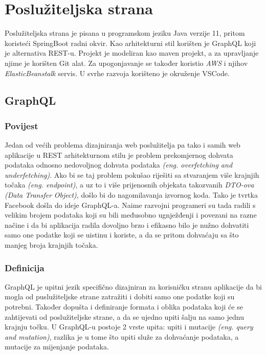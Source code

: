 \documentclass[times, utf8, zavrsni]{fer}
\begin{document}
\begin{multicols}{2}
      
      \label{lst:SQL kod}
\end{multicols}

\chapter{Poslužiteljska strana}
Poslužiteljska strana je pisana u programskom jeziku Java verzije 11, pritom koristeći
SpringBoot radni okvir. Kao arhitekturni stil korišten je GraphQL koji je alternativa REST-u.
Projekt je modeliran kao maven projekt, a za upravljanje njime je korišten Git alat. Za upogonjavanje
se također koristio \textit{AWS} i njihov \textit{ElasticBeanstalk} servis. U svrhe razvoja korišteno je okruženje VSCode.

\section{GraphQL}

\subsection{Povijest}
Jedan od većih problema dizajniranja web poslužitelja pa tako i samih web aplikacije u REST
arhitekturnom stilu je problem prekomjernog dohvata podataka odnosno nedovoljnog dohvata podataka
\textit{(eng. overfetching and underfetching)}. Ako bi se taj problem pokušao riješiti sa
stvaranjem više krajnjih točaka \textit{(eng. endpoint)}, a uz to i više prijenosnih objekata takozvanih \textit{DTO-ova (Data Transfer Object)},
došlo bi do nagomilavanja izvornog koda. Tako je tvrtka Facebook došla
do ideje GraphQL-a. Naime razvojni programeri su tada radili s velikim brojem podataka koji su
bili međusobno ugnježđenji i povezani na razne načine i da bi aplikacija radila dovoljno brzo
i efikasno bilo je nužno dohvatiti samo one podatke koji se uistinu i koriste, a da se pritom dohvaćaju sa
što manjeg broja krajnjih točaka.

\subsection{Definicija}
GraphQL je upitni jezik specifično dizajniran za korisničku stranu aplikacije da bi mogla
od puslužiteljske strane zatražiti i dobiti samo one podatke koji su potrebni. Također
dopušta i definiranje formata i oblika podataka koji će se zahtijevati od poslužiteljske strane, a
da se ujedno upiti šalju na samo jednu krajnju točku. U GraphQL-u postoje 2 vrste upita:
upiti i mutacije \textit{(eng. query and mutation)}, razlika je u tome što upiti služe za dohvaćanje podataka,
a mutacije za mijenjanje podataka.
\end{document}
